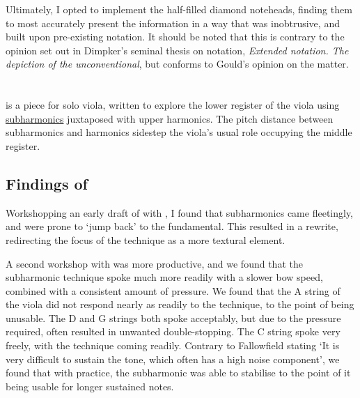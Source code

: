 Ultimately, I opted to implement the half-filled diamond noteheads, finding them to most accurately present the information in a way that was inobtrusive, and built upon pre-existing notation.
It should be noted that this is contrary to the opinion set out in Dimpker's seminal thesis on notation, \emph{Extended notation. The depiction of the
unconventional}, but conforms to Gould's opinion on the matter.\autocites[120-121]{dimpkerExtendedNotationDepiction2012}[61]{gouldBars2011}


\section{\violaPiece} \label{sec:violaPiece}
\violaPiece \space is a piece for solo viola, written to explore the lower register of the viola using \hyperref[sec:subharmonicsDiscussion]{subharmonics} juxtaposed with upper harmonics. 
The pitch distance between subharmonics and harmonics sidestep the viola's usual role occupying the middle register.



\subsection{Findings of \violaPiece}
Workshopping an early draft of \violaPiece \space with \violaParticipant, I found that subharmonics came fleetingly, and were prone to `jump back' to the fundamental.\autocite[]{appleseedFeedbackExploratorySession2019}
This resulted in a rewrite, redirecting the focus of the technique as a more textural element. 


A second workshop with \violaParticipant was more productive, and we found that the subharmonic technique spoke much more readily with a slower bow speed, combined with a consistent amount of pressure.\autocite[]{appleseedFeedbackSightreadingSession2019}
We found that the A string of the viola did not respond nearly as readily to the technique, to the point of being unusable.
The D and G strings both spoke acceptably, but due to the pressure required, often resulted in unwanted double-stopping.
The C string spoke very freely, with the technique coming readily.
Contrary to Fallowfield stating `It is very difficult to sustain the tone, which often has a high noise component', we found that with practice, the subharmonic was able to stabilise to the point of it being usable for longer sustained notes.\autocites[http://www.cellomap.com/index/the-string/plucking-striking-and-bowing-the-string/how.html]{fallowfieldCelloMapHandbook2009}[]{fallowfieldCelloMapExample2013}[]{appleseedFeedbackSightreadingSession2019}


